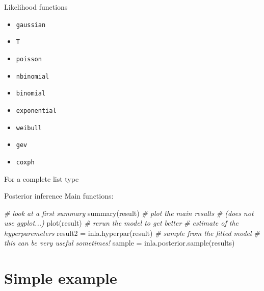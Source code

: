 \documentclass[
  ignorenonframetext,
]{beamer}
\newenvironment{Shaded}{\begin{snugshade}}{\end{snugshade}}
\newcommand{\CommentTok}[1]{\textcolor[rgb]{0.56,0.35,0.01}{\textit{#1}}}
\newcommand{\FunctionTok}[1]{\textcolor[rgb]{0.00,0.00,0.00}{#1}}
\newcommand{\NormalTok}[1]{#1}
\newcommand{\OtherTok}[1]{\textcolor[rgb]{0.56,0.35,0.01}{#1}}
\newcommand{\SpecialCharTok}[1]{\textcolor[rgb]{0.00,0.00,0.00}{#1}}
\begin{document}
\begin{frame}[fragile]{Likelihood functions}
\protect\hypertarget{likelihood-functions}{}
\begin{itemize}
\item
  \texttt{gaussian}
\item
  \texttt{T}
\item
  \texttt{poisson}
\item
  \texttt{nbinomial}
\item
  \texttt{binomial}
\item
  \texttt{exponential}
\item
  \texttt{weibull}
\item
  \texttt{gev}
\item
  \texttt{coxph}
\end{itemize}

For a complete list type

\begin{Shaded}
\end{Shaded}
\end{frame}

\begin{frame}[fragile]{Posterior inference}
\protect\hypertarget{posterior-inference}{}
Main functions:

\begin{Shaded}
\begin{Highlighting}[]
\CommentTok{\# look at a  first summary}
\FunctionTok{summary}\NormalTok{(result)}
\CommentTok{\# plot the main results}
\CommentTok{\# (does not use ggplot...)}
\FunctionTok{plot}\NormalTok{(result)}
\CommentTok{\# rerun the model to get better}
\CommentTok{\# estimate of the hyperparemeters}
\NormalTok{result2 }\OtherTok{=} \FunctionTok{inla.hyperpar}\NormalTok{(result)}
\CommentTok{\# sample from the fitted model}
\CommentTok{\# this can be very useful sometimes!}
\NormalTok{sample }\OtherTok{=} \FunctionTok{inla.posterior.sample}\NormalTok{(results)}
\end{Highlighting}
\end{Shaded}
\end{frame}

\hypertarget{simple-example}{%
\section{Simple example}\label{simple-example}}
\end{document}
